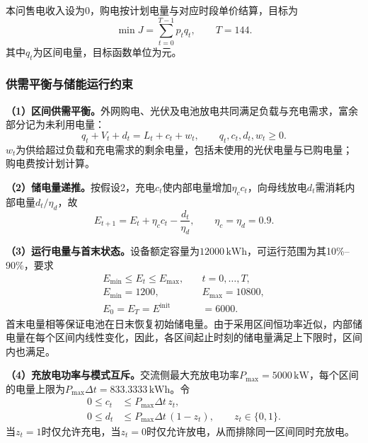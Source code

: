 本问售电收入设为0，购电按计划电量与对应时段单价结算，目标为
\begin{equation}
    \min J=\sum_{t=0}^{T-1}p_tq_t,\qquad T=144.
    \label{eq:q1-objective}
\end{equation}
其中$q_t$为区间电量，目标函数单位为元。

\subsubsection{供需平衡与储能运行约束}

\textbf{（1）区间供需平衡。}外网购电、光伏及电池放电共同满足负载与充电需求，富余部分记为未利用电量：
\begin{equation}
    q_t+V_t+d_t=L_t+c_t+w_t,\qquad
    q_t,c_t,d_t,w_t\geq0.
    \label{eq:q1-balance}
\end{equation}
$w_t$为供给超过负载和充电需求的剩余电量，包括未使用的光伏电量与已购电量；购电费按计划计算。

\textbf{（2）储电量递推。}按假设2，充电$c_t$使内部电量增加$\eta_c c_t$，向母线放电$d_t$需消耗内部电量$d_t/\eta_d$，故
\begin{equation}
    E_{t+1}=E_t+\eta_c c_t-\frac{d_t}{\eta_d},
    \qquad \eta_c=\eta_d=0.9.
    \label{eq:q1-soc}
\end{equation}

\textbf{（3）运行电量与首末状态。}设备额定容量为$12000\,\mathrm{kWh}$，可运行范围为其10\%--90\%，要求
\begin{equation}
    \begin{aligned}
        E_{\min}\leq E_t\leq E_{\max},\quad &t=0,\ldots,T,\\
        E_{\min}=1200,\qquad &E_{\max}=10800,\\
        E_0=E_T=E^{\mathrm{init}}&=6000.
    \end{aligned}
    \label{eq:q1-bounds}
\end{equation}
首末电量相等保证电池在日末恢复初始储电量。由于采用区间恒功率近似，内部储电量在每个区间内线性变化，因此，各区间起止时刻的储电量满足上下限时，区间内也满足。

\textbf{（4）充放电功率与模式互斥。}交流侧最大充放电功率$P_{\max}=5000\,\mathrm{kW}$，每个区间的电量上限为$P_{\max}\Delta t=833.3333\,\mathrm{kWh}$。令
\begin{equation}
    \begin{aligned}
        0\leq c_t&\leq P_{\max}\Delta t\,z_t,\\
        0\leq d_t&\leq P_{\max}\Delta t\,(1-z_t),\qquad z_t\in\{0,1\}.
    \end{aligned}
    \label{eq:q1-mode}
\end{equation}
当$z_t=1$时仅允许充电，当$z_t=0$时仅允许放电，从而排除同一区间同时充放电。

